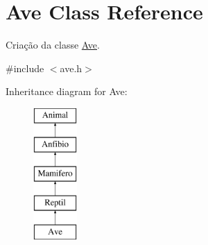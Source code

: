 \hypertarget{class_ave}{}\section{Ave Class Reference}
\label{class_ave}


Criação da classe \mbox{\hyperlink{class_ave}{Ave}}.  




{\ttfamily \#include $<$ave.\+h$>$}

Inheritance diagram for Ave\+:\begin{figure}[H]
\begin{center}
\leavevmode
\includegraphics[height=5.000000cm]{class_ave}
\end{center}
\end{figure}
